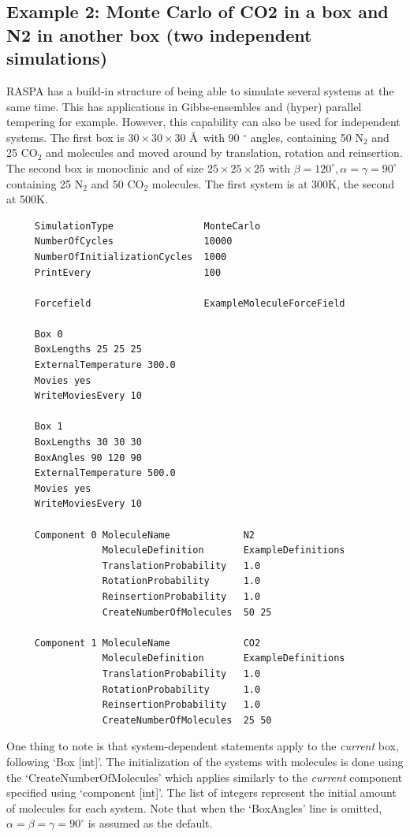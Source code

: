 \subsection*{Example 2: Monte Carlo of CO2 in a box and N2 in another box (two independent simulations)}

RASPA has a build-in structure of being able to simulate several systems at the same time. This has applications in Gibbs-ensembles and (hyper) parallel tempering
for example. However, this capability can also be used for independent systems. The first box is $30\times30\times30$ \AA\ with 90 $^\circ$ angles,
containing 50 N$_2$ and 25 CO$_2$ and molecules and moved around by translation, rotation and reinsertion. The second box is monoclinic 
and of size $25\times25\times25$ with 
$\beta=120^\circ,\alpha=\gamma=90^\circ$ containing 25 N$_2$ and 50 CO$_2$ molecules. The first system is at 300K, the second at 500K. 

\begin{tiny}
\begin{verbatim}
     SimulationType                MonteCarlo
     NumberOfCycles                10000
     NumberOfInitializationCycles  1000
     PrintEvery                    100
     
     Forcefield                    ExampleMoleculeForceField
     
     Box 0
     BoxLengths 25 25 25
     ExternalTemperature 300.0
     Movies yes
     WriteMoviesEvery 10
     
     Box 1
     BoxLengths 30 30 30
     BoxAngles 90 120 90
     ExternalTemperature 500.0
     Movies yes
     WriteMoviesEvery 10
     
     Component 0 MoleculeName             N2
                 MoleculeDefinition       ExampleDefinitions
                 TranslationProbability   1.0
                 RotationProbability      1.0
                 ReinsertionProbability   1.0
                 CreateNumberOfMolecules  50 25
     
     Component 1 MoleculeName             CO2
                 MoleculeDefinition       ExampleDefinitions
                 TranslationProbability   1.0
                 RotationProbability      1.0
                 ReinsertionProbability   1.0
                 CreateNumberOfMolecules  25 50
\end{verbatim}
\end{tiny}
One thing to note is that system-dependent statements apply to the \emph{current} box, following `Box [int]'. The initialization
of the systems with molecules is done using the `CreateNumberOfMolecules' which applies similarly to the \emph{current} component
specified using `component [int]'. The list of integers represent the initial amount of molecules for each system. Note that when the
`BoxAngles' line is omitted, $\alpha=\beta=\gamma=90^\circ$ is assumed as the default.

